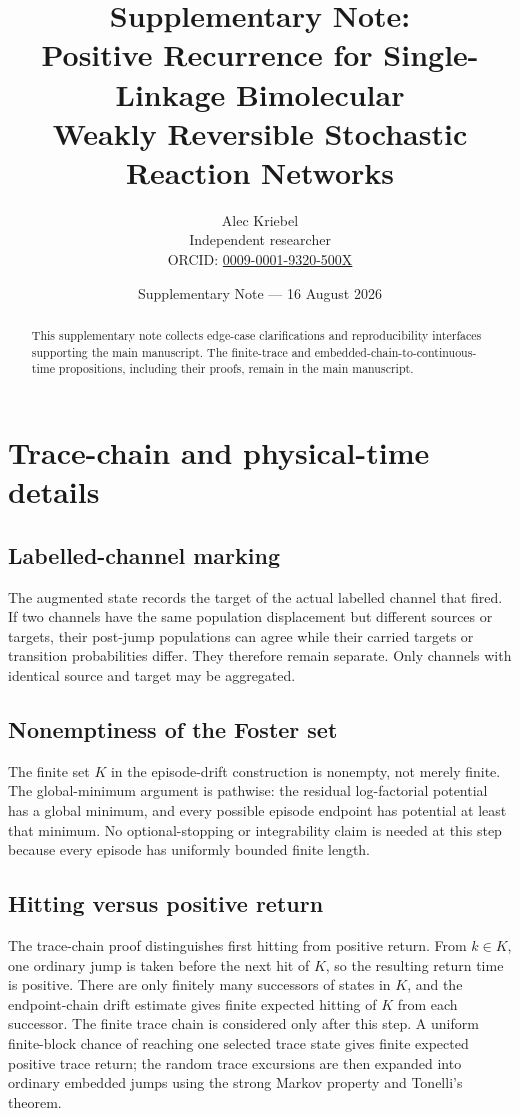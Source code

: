 \documentclass[10pt]{article}
\title{\bfseries Supplementary Note:\\[0.25em]
Positive Recurrence for Single-Linkage Bimolecular\\
Weakly Reversible Stochastic Reaction Networks}
\author{Alec Kriebel\\[0.2em]
\small Independent researcher\\
\small ORCID: \href{https://orcid.org/0009-0001-9320-500X}{0009-0001-9320-500X}}
\date{Supplementary Note --- 16 August 2026}
\begin{document}
\maketitle

\begin{abstract}
This supplementary note collects edge-case clarifications and reproducibility
interfaces supporting the main manuscript.  The finite-trace and
embedded-chain-to-continuous-time propositions, including their proofs, remain
in the main manuscript.
\end{abstract}

\section{Trace-chain and physical-time details}

\subsection{Labelled-channel marking}

The augmented state records the target of the actual labelled channel that
fired.  If two channels have the same population displacement but different
sources or targets, their post-jump populations can agree while their carried
targets or transition probabilities differ.  They therefore remain separate.
Only channels with identical source and target may be aggregated.

\subsection{Nonemptiness of the Foster set}

The finite set $K$ in the episode-drift construction is nonempty, not merely
finite.  The global-minimum argument is pathwise: the residual log-factorial
potential has a global minimum, and every possible episode endpoint has
potential at least that minimum.  No optional-stopping or integrability claim
is needed at this step because every episode has uniformly bounded finite
length.

\subsection{Hitting versus positive return}

The trace-chain proof distinguishes first hitting from positive return.  From
$k\in K$, one ordinary jump is taken before the next hit of $K$, so the
resulting return time is positive.  There are only finitely many successors of
states in $K$, and the endpoint-chain drift estimate gives finite expected
hitting of $K$ from each successor.  The finite trace chain is considered only
after this step.  A uniform finite-block chance of reaching one selected trace
state gives finite expected positive trace return; the random trace excursions
are then expanded into ordinary embedded jumps using the strong Markov
property and Tonelli's theorem.
\end{document}
